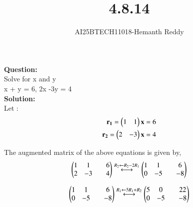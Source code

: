 \documentclass[journal]{IEEEtran}
\begin{document}

\vspace{3cm}

\title{4.8.14}
\author{AI25BTECH11018-Hemanth Reddy}
 \maketitle
{\let\newpage\relax\maketitle}

\renewcommand{\thefigure}{\theenumi}
\renewcommand{\thetable}{\theenumi}
\setlength{\intextsep}{10pt} %


\renewcommand{\thetable}{\theenumi}

\textbf{Question:}\\

Solve for x and y\\

x + y = 6, 2x -3y = 4\\
\textbf{Solution:}\\

Let :
\begin{align}
    \mathbf{r_1} = \begin{pmatrix}1 & 1 \end{pmatrix}\mathbf{x} = 6 \\
    \mathbf{r_2} = \begin{pmatrix}2 & -3\end{pmatrix}\mathbf{x} = 4
\end{align}

The augmented matrix of the above equations is given by,\\
\begin{align}
    \begin{pmatrix} 1&1&&6\\ 2&-3&&4\end{pmatrix} \stackrel{R_2 \leftarrow R_2 - 2R_1}{\longleftrightarrow}\begin{pmatrix} 1&1&&6\\ 0&-5&&-8\end{pmatrix} 
\end{align}

\begin{align}
    \begin{pmatrix} 1&1&&6\\ 0&-5&&-8\end{pmatrix} \stackrel{R_1 \leftarrow 5R_1 +R_2}{\longleftrightarrow}\begin{pmatrix} 5&0&&22\\ 0&-5&&-8\end{pmatrix} 
\end{align}
\end{document}
